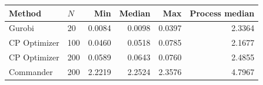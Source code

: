 \begin{tabular}{@{}llrrrr@{}}
\toprule
Method & $N$ & Min & Median & Max & Process median \\ \midrule
Gurobi & 20 & 0.0084 & 0.0098 & 0.0397 & 2.3364 \\
CP Optimizer & 100 & 0.0460 & 0.0518 & 0.0785 & 2.1677 \\
CP Optimizer & 200 & 0.0589 & 0.0643 & 0.0760 & 2.4855 \\
Commander & 200 & 2.2219 & 2.2524 & 2.3576 & 4.7967 \\
\bottomrule
\end{tabular}
